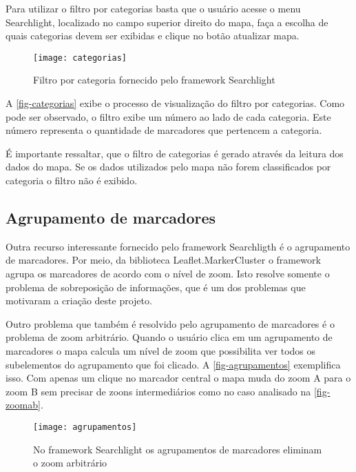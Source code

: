 Para utilizar o filtro por categorias basta que o usuário acesse o menu Searchlight, localizado no campo superior direito do mapa, faça a escolha de quais categorias devem ser exibidas e clique no botão atualizar mapa. 

\begin{figure}[htb]
	\caption{\label{fig-categorias}Filtro por categoria fornecido pelo framework Searchlight}
	\begin{center}
	    \texttt{[image: categorias]}
	\end{center}
\end{figure}

A \autoref{fig-categorias} exibe o processo de visualização do filtro por categorias.
Como pode ser observado, o filtro  exibe um número ao lado de cada categoria. Este número representa o quantidade de marcadores que pertencem a categoria.

É importante ressaltar, que o filtro de categorias é gerado através da leitura dos dados do mapa. Se os dados utilizados pelo mapa não forem classificados por categoria o filtro não é exibido.

\subsection{Agrupamento de marcadores}	
Outra recurso interessante fornecido pelo framework Searchligth é o agrupamento de marcadores. Por meio, da biblioteca Leaflet.MarkerCluster o framework agrupa os marcadores de acordo com o nível de zoom. Isto resolve somente o problema de sobreposição de informações, que é um dos problemas que motivaram a criação deste projeto. 

Outro problema que também é resolvido pelo agrupamento de marcadores é o problema de zoom arbitrário. Quando o usuário clica em um agrupamento de marcadores o mapa calcula um nível de zoom que possibilita ver todos os subelementos do agrupamento que foi clicado. A \autoref{fig-agrupamentos} exemplifica isso. Com apenas um clique no marcador central o mapa muda do zoom A para o zoom B sem precisar de zoons intermediários como no caso analisado na \autoref{fig-zoomab}.


\begin{figure}[htb]
	\caption{\label{fig-agrupamentos}No framework Searchlight os agrupamentos de marcadores eliminam o zoom arbitrário}
	\begin{center}
	    \texttt{[image: agrupamentos]}
	\end{center}
\end{figure}


